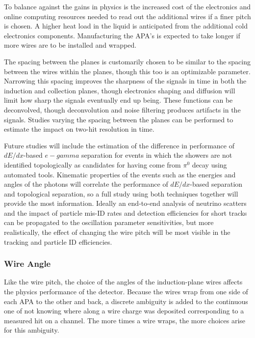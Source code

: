 To balance against the gains in physics is the increased cost of the electronics and
online computing resources needed to read out the additional wires if a finer pitch is chosen.
A higher heat load in the liquid is anticipated from the additional cold electronics components.
Manufacturing the APA's is expected to take longer if more wires are to be installed and wrapped.

The spacing between the planes is customarily chosen to be similar to the spacing between
the wires within the planes, though this too is an optimizable parameter.  Narrowing this
spacing improves the sharpness of the signals in time in both the induction and collection planes,
though electronics shaping and diffusion will limit how sharp the signals eventually end up being.
These functions can be deconvolved, though deconvolution and noise filtering produces 
artifacts in the signals.  Studies varying the spacing between the planes can be performed
to estimate the impact on two-hit resolution in time.

Future studies will include the estimation of the difference in performance of $dE/dx$-based
$e-gamma$ separation for events in which the showers are not identified topologically as
candidates for having come from $\pi^0$ decay using automated tools.  Kinematic properties
of the events such as the energies and angles of the photons will correlate the performance
of $dE/dx$-based separation and topological separation, so a full study using both techniques
together will provide the most information.  Ideally an end-to-end analysis of neutrino
scatters and the impact of particle mis-ID rates and detection efficiencies for short tracks
can be propagated to the oscillation parameter sensitivities, but more realistically, the
effect of changing the wire pitch will be most visible in the 
tracking and particle ID efficiencies.

\subsubsection{Wire Angle}

Like the wire pitch, the choice of the angles of the induction-plane wires affects the
physics performance of the detector.  Because the wires wrap from one side of each APA
to the other and back, a discrete ambiguity is added to the continuous one of not knowing
where along a wire charge was deposited corresponding to a measured hit on a channel.
The more times a wire wraps, the more choices arise for this ambiguity.

